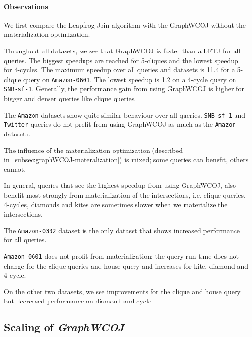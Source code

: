 \paragraph{Observations}

We first compare the Leapfrog Join algorithm with the GraphWCOJ without the materialization optimization.

Throughout all datasets, we see that GraphWCOJ is faster than a \textsc{LFTJ} for all queries.
The biggest speedups are reached for 5-cliques and the lowest speedup for 4-cycles.
The maximum speedup over all queries and datasets is 11.4 for a 5-clique query on \texttt{Amazon-0601}.
The lowest speedup is 1.2 on a 4-cycle query on \texttt{SNB-sf-1}.
Generally, the performance gain from using GraphWCOJ is higher for bigger and denser queries like clique
queries.

The \texttt{Amazon} datasets show quite similar behaviour over all queries.
\texttt{SNB-sf-1} and \texttt{Twitter} queries do not profit from using GraphWCOJ as much as
the \texttt{Amazon} datasets.

The influence of the materialization optimization (described in~\cref{subsec:graphWCOJ-materalization})
is mixed;
some queries can benefit, others cannot.

In general, queries that see the highest speedup from using GraphWCOJ, also benefit most strongly
from materialization of the intersections, i.e. clique queries.
4-cycles, diamonds and kites are sometimes slower when we materialize the intersections.

The \texttt{Amazon-0302} dataset is the only dataset that shows increased performance for all
queries.

\texttt{Amazon-0601} does not profit from materialization;
the query run-time does not change for the clique queries and house query and
increases for kite, diamond and 4-cycle.

On the other two datasets, we see improvements for the clique and house query but decreased
performance on diamond and cycle.




\subsection{Scaling of \textit{Graph\textsc{WCOJ}}} \label{subsec:scaling-graphWCOJ}

